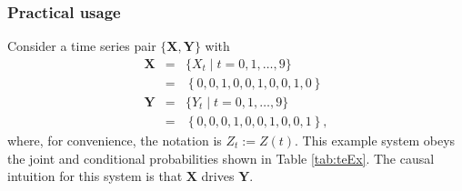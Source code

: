 \documentclass{article}[10pt]
\begin{document}
\subsubsection{Practical usage}
\label{sec:tePUSE}
Consider a time series pair $\{\mathbf{X},\mathbf{Y}\}$ with
\begin{eqnarray*}
\mathbf{X} &=& \{X_t\; | \; t=0,1,\ldots,9\}\\
&=& \left\{0,0,1,0,0,1,0,0,1,0\right\}\\
\mathbf{Y} &=& \{Y_t\; | \; t=0,1,\ldots,9\}\\
&=& \left\{0,0,0,1,0,0,1,0,0,1\right\},
\end{eqnarray*}
where, for convenience, the notation is $Z_t := Z(t)$. This example system obeys the joint and conditional probabilities shown in Table \ref{tab:teEx}.  The causal intuition for this system is that $\mathbf{X}$ drives $\mathbf{Y}$.  
\end{document}

